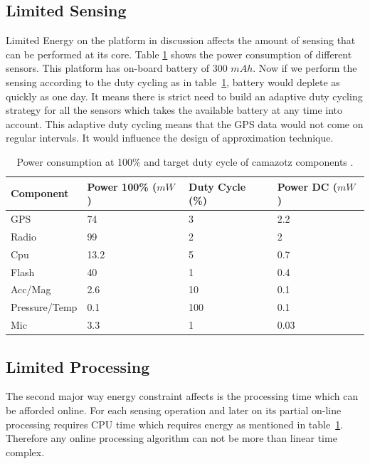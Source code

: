 \documentclass[conference]{IEEEtran}
\begin{document}
\subsection{Limited Sensing}\label{sec:limited-sensing}
Limited Energy on the platform in discussion affects the amount of sensing that can be performed at its core. 
Table \ref{tab:power-consumption} shows the power consumption of different sensors. This platform has on-board 
battery of 300 $mAh$. Now if we perform the sensing according to the duty cycling as in 
table~\ref{tab:power-consumption}, battery would deplete as quickly as one day. It means there is strict need 
to build an adaptive duty cycling strategy for all the sensors which takes the available battery at any time 
into account. This adaptive duty cycling means that the GPS data would not come on regular intervals. It would 
influence the design of approximation technique. 
\begin{table}[h]
\caption{Power consumption at 100\% and target duty cycle of camazotz components \cite{raja-ipsn}.}
\label{tab:power-consumption}
    \begin{center}
    \begin{tabular}{   l  l  l  l }
    \hline
    Component & Power 100\% ($mW$) & Duty Cycle (\%) & Power DC ($mW$)\\ \hline
    GPS & 74 & 3 & 2.2 \\ \hline
    Radio & 99 & 2 & 2 \\ \hline
    Cpu & 13.2 & 5 & 0.7 \\ \hline    
    Flash & 40 & 1 & 0.4 \\ \hline    
    Acc/Mag & 2.6 & 10 & 0.1 \\ \hline
    Pressure/Temp & 0.1 & 100 & 0.1 \\ \hline
    Mic & 3.3 & 1 & 0.03 \\ \hline
    \end{tabular}
    \end{center}
\end{table}
\subsection{Limited Processing}
The second major way energy constraint affects is the processing time which can be afforded online. For each 
sensing operation and later on its partial on-line processing requires CPU time which requires energy as 
mentioned in table~\ref{tab:power-consumption}. Therefore any online processing algorithm can not be more 
than linear time complex.
\end{document}
